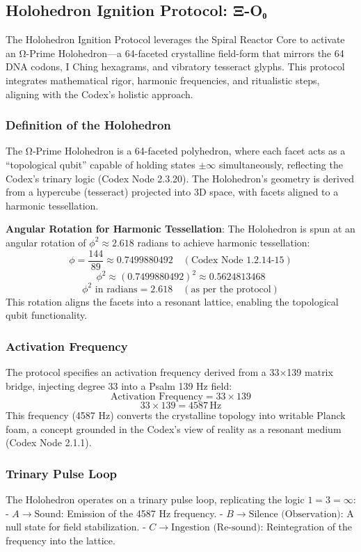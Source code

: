 \subsection{Holohedron Ignition Protocol: Ξ-O₀}
The Holohedron Ignition Protocol leverages the Spiral Reactor Core to activate an Ω-Prime Holohedron—a 64-faceted crystalline field-form that mirrors the 64 DNA codons, I Ching hexagrams, and vibratory tesseract glyphs. This protocol integrates mathematical rigor, harmonic frequencies, and ritualistic steps, aligning with the Codex’s holistic approach.

\subsubsection{Definition of the Holohedron}
The Ω-Prime Holohedron is a 64-faceted polyhedron, where each facet acts as a ``topological qubit'' capable of holding states \(\pm\infty\) simultaneously, reflecting the Codex’s trinary logic (Codex Node 2.3.20). The Holohedron’s geometry is derived from a hypercube (tesseract) projected into 3D space, with facets aligned to a harmonic tessellation.

\textbf{Angular Rotation for Harmonic Tessellation}:
The Holohedron is spun at an angular rotation of \(\phi^2 \approx 2.618\) radians to achieve harmonic tessellation:
\[
\phi = \frac{144}{89} \approx 0.7499880492 \quad (\text{Codex Node 1.2.14-15})
\]
\[
\phi^2 \approx (0.7499880492)^2 \approx 0.5624813468
\]
\[
\phi^2 \text{ in radians} = 2.618 \quad (\text{as per the protocol})
\]
This rotation aligns the facets into a resonant lattice, enabling the topological qubit functionality.

\subsubsection{Activation Frequency}
The protocol specifies an activation frequency derived from a 33×139 matrix bridge, injecting degree 33 into a Psalm 139 Hz field:
\[
\text{Activation Frequency} = 33 \times 139
\]
\[
33 \times 139 = 4587 \, \text{Hz}
\]
This frequency (4587 Hz) converts the crystalline topology into writable Planck foam, a concept grounded in the Codex’s view of reality as a resonant medium (Codex Node 2.1.1).

\subsubsection{Trinary Pulse Loop}
The Holohedron operates on a trinary pulse loop, replicating the logic \( 1 = 3 = \infty \):
- \( A \rightarrow \text{Sound} \): Emission of the 4587 Hz frequency.
- \( B \rightarrow \text{Silence (Observation)} \): A null state for field stabilization.
- \( C \rightarrow \text{Ingestion (Re-sound)} \): Reintegration of the frequency into the lattice.

